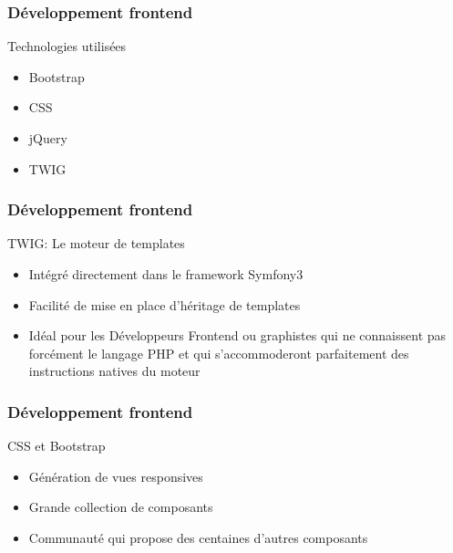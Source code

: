 \speaker{\Juliana}

\begin{frame}
\frametitle{Développement frontend}
\begin{block}{Technologies utilisées}
	\begin{itemize}
		\item Bootstrap
		\item CSS
		\item jQuery
		\item TWIG
	\end{itemize}
\end{block}
\end{frame}

\begin{frame}
\frametitle{Développement frontend}
\begin{block}{TWIG: Le moteur de templates }
	\begin{itemize}
		\item Intégré directement dans le framework Symfony3
		\item Facilité de mise en place d'héritage de templates
		\item Idéal pour les Développeurs Frontend ou graphistes qui ne connaissent pas forcément le langage PHP et qui s'accommoderont parfaitement des instructions natives du moteur
	\end{itemize}
\end{block}
\end{frame}

\begin{frame}
\frametitle{Développement frontend}
\begin{block}{ CSS et Bootstrap }
	\begin{itemize}
		\item Génération de vues responsives
		\item Grande collection de composants
		\item Communauté qui propose des centaines d'autres composants
	\end{itemize}
\end{block}
\end{frame}

